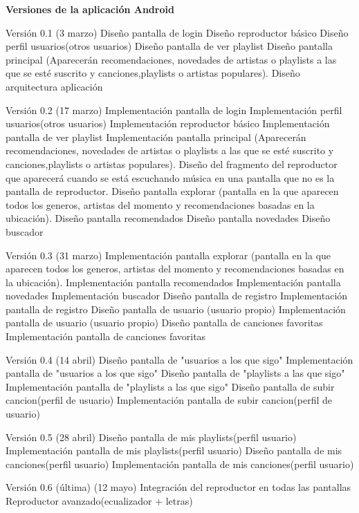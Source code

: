 \documentclass[12pt]{article}%
\begin{document}
\textbf{Versiones de la aplicaci\'on Android}

Versi\'on 0.1 (3 marzo)
Diseño pantalla de login
Diseño reproductor b\'asico
Diseño perfil usuarios(otros usuarios)
Diseño pantalla de ver playlist
Diseño pantalla principal (Aparecer\'an recomendaciones, novedades de artistas o playlists a las que se est\'e suscrito y canciones,playlists o artistas populares).
Diseño arquitectura aplicaci\'on

Versi\'on 0.2 (17 marzo)
Implementaci\'on pantalla de login
Implementaci\'on perfil usuarios(otros usuarios)
Implementaci\'on reproductor b\'asico
Implementaci\'on pantalla de ver playlist
Implementaci\'on pantalla principal (Aparecer\'an recomendaciones, novedades de artistas o playlists a las que se est\'e suscrito y canciones,playlists o artistas populares).
Diseño del fragmento del reproductor que aparecer\'a cuando se est\'a escuchando m\'usica en una pantalla que no es la pantalla de reproductor.
Diseño pantalla explorar (pantalla en la que aparecen todos los generos, artistas del momento y recomendaciones basadas en la ubicaci\'on).
Diseño pantalla recomendados
Diseño pantalla novedades
Diseño buscador

Versi\'on 0.3 (31 marzo)
Implementaci\'on pantalla explorar (pantalla en la que aparecen todos los generos, artistas del momento y recomendaciones basadas en la ubicaci\'on).
Implementaci\'on pantalla recomendados
Implementaci\'on pantalla novedades
Implementaci\'on buscador
Diseño pantalla de registro
Implementaci\'on pantalla de registro
Diseño pantalla de usuario (usuario propio)
Implementaci\'on pantalla de usuario (usuario propio)
Diseño pantalla de canciones favoritas
Implementaci\'on pantalla de canciones favoritas

Versi\'on 0.4 (14 abril)
Diseño pantalla de "usuarios a los que sigo"
Implementaci\'on pantalla de "usuarios a los que sigo"
Diseño pantalla de "playlists a las que sigo"
Implementaci\'on pantalla de "playlists a las que sigo"
Diseño pantalla de subir cancion(perfil de usuario)
Implementaci\'on pantalla de subir cancion(perfil de usuario)

Versi\'on 0.5 (28 abril)
Diseño pantalla de mis playlists(perfil usuario)
Implementaci\'on pantalla de mis playlists(perfil usuario)
Diseño pantalla de mis canciones(perfil usuario)
Implementaci\'on pantalla de mis canciones(perfil usuario)

Versi\'on 0.6 (\'ultima) (12 mayo)
Integraci\'on del reproductor en todas las pantallas
Reproductor avanzado(ecualizador + letras)
\end{document}
